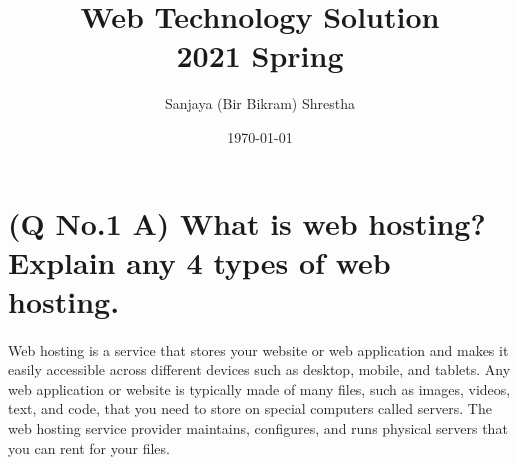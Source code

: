 \documentclass[11pt]{article}
\title{ Web Technology Solution\\2021 Spring}
\author{ Sanjaya (Bir Bikram) Shrestha }
\date{\today}
\begin{document}
\maketitle	
\pagestyle{fancy}

\tableofcontents
\pagebreak



\section{(Q No.1 A) What is web hosting? Explain any 4 types of web hosting.}

\paragraph{}
Web hosting is a service that stores your website or web application and makes it easily accessible across different devices such as desktop, mobile, and tablets. Any web application or website is typically made of many files, such as images, videos, text, and code, that you need to store on special computers called servers. The web hosting service provider maintains, configures, and runs physical servers that you can rent for your files.
\end{document}

